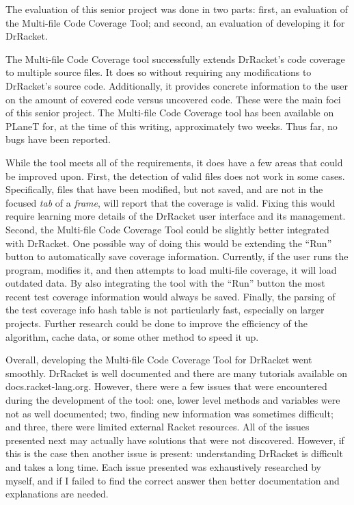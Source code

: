 The evaluation of this senior project was done in two parts: first, an evaluation of the Multi-file Code Coverage Tool; and second, an evaluation of developing it for DrRacket.

The Multi-file Code Coverage tool successfully extends DrRacket's code coverage to multiple source files. It does so without requiring any modifications to DrRacket's source code. Additionally, it provides concrete information to the user on the amount of covered code versus uncovered code. These were the main foci of this senior project. The Multi-file Code Coverage tool has been available on PLaneT for, at the time of this writing, approximately two weeks. Thus far, no bugs have been reported.

While the tool meets all of the requirements, it does have a few areas that could be improved upon. First, the detection of valid files does not work in some cases. Specifically, files that have been modified, but not saved, and are not in the focused \emph{tab} of a \emph{frame}, will report that the coverage is valid. Fixing this would require learning more details of the DrRacket user interface and its management. Second, the Multi-file Code Coverage Tool could be slightly better integrated with DrRacket. One possible way of doing this would be extending the ``Run'' button to automatically save coverage information. Currently, if the user runs the program, modifies it, and then attempts to load multi-file coverage, it will load outdated data. By also integrating the tool with the ``Run'' button the most recent test coverage information would always be saved. Finally, the parsing of the test coverage info hash table is not particularly fast, especially on larger projects. Further research could be done to improve the efficiency of the algorithm, cache data, or some other method to speed it up.

Overall, developing the Multi-file Code Coverage Tool for DrRacket went smoothly. DrRacket is well documented and there are many tutorials available on docs.racket-lang.org. However, there were a few issues that were encountered during the development of the tool: one, lower level methods and variables were not as well documented; two, finding new information was sometimes difficult; and three, there were limited external Racket resources. All of the issues presented next may actually have solutions that were not discovered. However, if this is the case then another issue is present: understanding DrRacket is difficult and takes a long time. Each issue presented was exhaustively researched by myself, and if I failed to find the correct answer then better documentation and explanations are needed.

